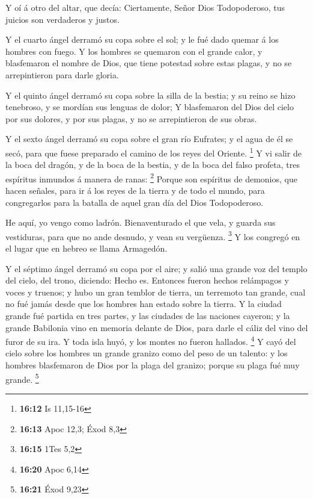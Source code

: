  Y oí á otro del altar, que decía: Ciertamente, Señor Dios
Todopoderoso, tus juicios son verdaderos y justos.

 Y el cuarto ángel derramó su copa sobre el sol; y le fué
dado quemar á los hombres con fuego.  Y los hombres se
quemaron con el grande calor, y blasfemaron el nombre de Dios, que tiene
potestad sobre estas plagas, y no se arrepintieron para darle gloria.

 Y el quinto ángel derramó su copa sobre la silla de la
bestia; y su reino se hizo tenebroso, y se mordían sus lenguas de dolor;
 Y blasfemaron del Dios del cielo por sus dolores, y por
sus plagas, y no se arrepintieron de sus obras.

 Y el sexto ángel derramó su copa sobre el gran río
Eufrates; y el agua de él se secó, para que fuese preparado el camino de
los reyes del Oriente. \footnote{\textbf{16:12} Is 11,15-16}
 Y vi salir de la boca del dragón, y de la boca de la
bestia, y de la boca del falso profeta, tres espíritus inmundos á manera
de ranas: \footnote{\textbf{16:13} Apoc 12,3; Éxod 8,3} 
Porque son espíritus de demonios, que hacen señales, para ir á los reyes
de la tierra y de todo el mundo, para congregarlos para la batalla de
aquel gran día del Dios Todopoderoso.

 He aquí, yo vengo como ladrón. Bienaventurado el que
vela, y guarda sus vestiduras, para que no ande desnudo, y vean su
vergüenza. \footnote{\textbf{16:15} 1Tes 5,2}  Y los
congregó en el lugar que en hebreo se llama Armagedón.

 Y el séptimo ángel derramó su copa por el aire; y salió
una grande voz del templo del cielo, del trono, diciendo: Hecho es.
 Entonces fueron hechos relámpagos y voces y truenos; y
hubo un gran temblor de tierra, un terremoto tan grande, cual no fué
jamás desde que los hombres han estado sobre la tierra. 
Y la ciudad grande fué partida en tres partes, y las ciudades de las
naciones cayeron; y la grande Babilonia vino en memoria delante de Dios,
para darle el cáliz del vino del furor de su ira.  Y toda
isla huyó, y los montes no fueron hallados. \footnote{\textbf{16:20}
  Apoc 6,14}  Y cayó del cielo sobre los hombres un
grande granizo como del peso de un talento: y los hombres blasfemaron de
Dios por la plaga del granizo; porque su plaga fué muy grande.
\footnote{\textbf{16:21} Éxod 9,23}

